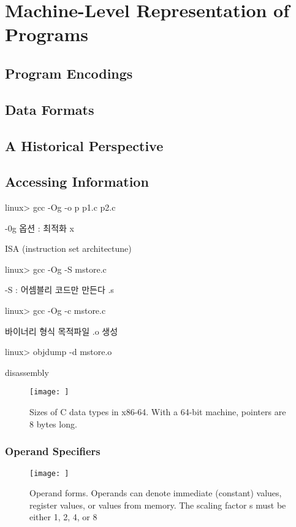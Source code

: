 

\chapter{Machine-Level Representation of Programs}


\section{Program Encodings}
\section{Data Formats}
\section{A Historical Perspective}
\section{Accessing Information}


linux> gcc -Og -o p p1.c p2.c


-0g 옵션 : 최적화 x

ISA (instruction set architectune)

linux> gcc -Og -S mstore.c

-S : 어셈블리 코드만 만든다 .s

linux> gcc -Og -c mstore.c

바이너리 형식 목적파일 .o  생성


linux> objdump -d mstore.o

disassembly


\begin{figure}[h!]
    \centering
    \texttt{[image: ]}
    \caption{Sizes of C data types in x86-64. With a 64-bit machine, pointers are 8 bytes long.}
\end{figure}



\subsection{Operand Specifiers}

\begin{figure}[h!]
    \centering
    \texttt{[image: ]}
    \caption{Operand forms. Operands can denote immediate (constant) values, register values, or values from memory. The scaling factor s must be either 1, 2, 4, or 8}
\end{figure}

